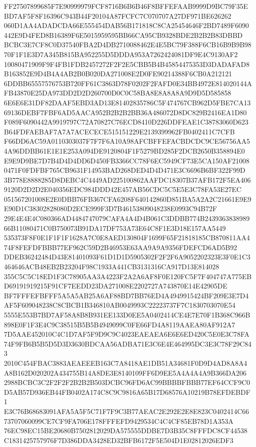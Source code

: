 \documentclass[UTF8,fontset=fandol,zihao=-4,a4paper]{ctexart}
\begin{document}
{{FF27507899685F7E90999979FCF8716B6B6B46F8BFFEFAAB9999D9BC79F35EBD7AF5F8F16396C943B44F20104A87FCFC7C070707A27DF971BE626262
060D1AA4ADADCDA66E555454DAB56B171818C8CA25454646F2BD7489F6090442E9D4FED8B16389F6E5015959595BB66CA95CB9328BDE2B2B2B83DBBD
BCBC3E7CF8C0D37540FBA2D4DB2710088462E4E5BC79F388F6CB16B9B9B9870F1F1E3D7A345B815BA952255D5DDDA953A7262424081DF9E4C9130AF2
10080471909F9F4FB1FDB2457272F2F2E5CBB5B4B45854475353D3DADAFAD8B163852E9D4B4A4AB2B0B020DA271008E2D0FE90214388F6CB0A212121
6DDBB65557576753B720FF61C3863D78F0202F2FAFD0E34BB4972E814020144AFB43870E25DA973DD2D2D260700D0C0C58BA8E8A8A8A9D9D5D585858
6E6E6E31DF82DAAF5EBD3AD13E81402835786C5F474767CB962D5FBE7CA1369136DEBF7FBF6AD5AACA952B2B2B2BB36A486072D8DC829B2416EA1D80
F089F6090442A9919797C72A70827C76ECD8410D226DDFEAE1C38783060D623B64FDFAEBAF7A7A7ACECECE515151229E2139399962FB0402411C7CFB
F66DD6AC59A0110303037F7F7F6A10A98AFCBFFEFACBDCDC9CE56756AA54A96DDBB61E1E1E253A094DE9120804F1F5279BD285F2DCB2650B358894E0
E9E9D9BE7D7B4D4D4DD6D450FB3366CC78F6EC5949CF73E5CA150AF210080471F0FDFBF765CB9631F14953BAD268DED4D4D471E3C6696B6BF322F99D
3B778E8888285D8DEBC4C4449AD225100862AAFDC18307B37AFB172F5EA4069120D2D2D2E040356EDC984DDD42E457AB56CDC5C5E5E3C78FA53E27EC
051567201008E2E0DBB76FB367CFA6208F640142860D851BA5A2A2C21661E9E9E90D1C38302828080D2ECE999F3D7B46153809048238E0993C94B72F
29E4E4E4C080366AD4484747079CAFA4A4D4B061C3DDBB774B243936383898966B11080471C0B750073B91DA17DF753A73E64C8F1E3D18E157AA5449
535373F8F0E1F1F1F1628A7C0E8AED130804F1699F65F21818185CB870811AA474F8FEFDFBBB77EF962C59D2B46953E63AA9A9A9356FDEFCD6AD5B92
DDEB36242484D43E81401093F61D1D1D5905302F2F2F6A9052202323E3F0E1C3464646ACB48EB2B23204F98C1933A441CB3131316CA917D13E814028
355C5C5C18ED1F3C78905AA3A4223F2A2A6AF8F0E120FC5F7F404747A775EBD69191919215F91CF7EEDD23DA271008E2202727A743870E14E42905DE
BF7FFFEFBFFF5A5A5AB25A6AF88BD7BB76ED4A4949915424BF209E3E7D4AF5F609048238C8CBCB1B346810AB0049993C22223737F7C1830703070E54
5555E553B7BD7AF58A8B8B931EE133D0EE5A0402414CE4E7E70F1B368C966B898E0F1F3E4C9C38515B5B5B4949099C0FE66FD4A8119AAEA80AF912A7
7D5AAE452010C4C1D7AF5F9D9C9C4023EAEAEA6E6E6ED420C5E0E3C78FA74F9FB6B5B5D5D3D3630BDCAA56ADBA71E3C6E4E464995DC3E3C78F29C843
2010C454FBAC3883AEAEEEB163C7A8418AE1DB51A34681F0D9D4AD8A8A4A8B162D020202A434755B14A8DE3E8140109FF6D9EE5A4A4A4A9B366DA206
2988BCBC3C2F2F2F2B2B2B503DCBC96FD6AC99BBBBFBBB77EF64CCF9C0D5AB57D936EB44FB0402A174C8C9C9816A65B17D68576A10219B78EFDEBDF1
E3C76B68683091AFA5A5F5C71F7F9C3B77AEAC2E292E2E8E823C0402414C6673707060099CE7CF9FA706E178FFFEFD9429534C4C4CF85EB78D1A353A
76EC98EC15BE20680B7502812029DA575555DDBE7D3B35C8FFFDC8CF44538C1831425757976F7D386DDA3428ED32BFB6172F5E504D1E02812026EDF3
}}
\end{document}
